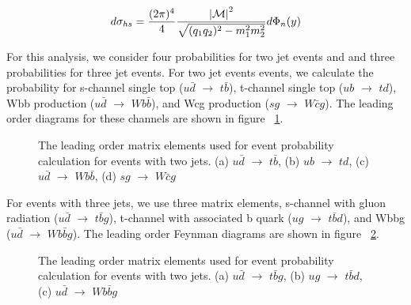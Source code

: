 \begin{equation}
\label{me}
d\sigma_{hs} = \frac{(2\pi)^4}{4} \frac{{|\cal M|}^{2}}{\sqrt{(q_{1}q_{2})^2 - m_{1}^2
m_{2}^2}} d\Phi_{n}(y)
\end{equation}

For this analysis, we consider four probabilities for two jet events and and three probabilities for three jet events. For two jet events events, we calculate the probability for s-channel single top ($u\bar{d}$ $\rightarrow$ $t\bar{b}$), t-channel single top ($ub$ $\rightarrow$ $td$), Wbb production ($u\bar{d}$ $\rightarrow$ $Wb\bar{b}$), and Wcg production ($sg$ $\rightarrow$ $W\bar{c}g$). The leading order diagrams for these channels are shown in figure ~\ref{2jets}.

\vspace{0.1in}
\begin{figure}[!h!tbp]
\begin{center}
\end{center}
\vspace{-0.1in}
\caption[2jets]{The leading order matrix elements used for event probability calculation for events with two jets. (a) $u\bar{d}$ $\rightarrow$ $t\bar{b}$, (b) $ub$ $\rightarrow$ $td$, (c) $u\bar{d}$ $\rightarrow$ $Wb\bar{b}$, (d) $sg$ $\rightarrow$ $W\bar{c}g$}
\label{2jets}
\end{figure}

For events with three jets, we use three matrix elements, s-channel with gluon radiation ($u\bar{d}$ $\rightarrow$ $t\bar{b}g$), t-channel with associated b quark ($ug$ $\rightarrow$ $t\bar{b}d$), and Wbbg ($u\bar{d}$ $\rightarrow$ $Wb\bar{b}g$). The leading order Feynman diagrams are shown in figure ~\ref{3jets}.

\vspace{0.1in}
\begin{figure}[!h!tbp]
\begin{center}
\end{center}
\vspace{-0.1in}
\caption[3jets]{The leading order matrix elements used for event probability calculation for events with two jets.  (a) $u\bar{d}$ $\rightarrow$ $t\bar{b}g$, (b) $ug$ $\rightarrow$ $t\bar{b}d$, (c) $u\bar{d}$ $\rightarrow$ $Wb\bar{b}g$}
\label{3jets}
\end{figure}

